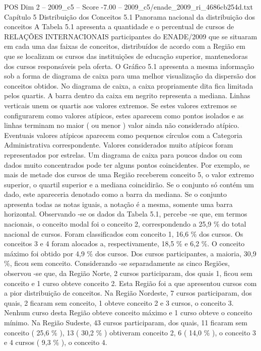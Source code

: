 \begin{textsample}{POS Dim 2 – 2009\_c5 – Score -7.00 – 2009\_c5/enade\_2009\_ri\_4686cb254d.txt}  \label{ex:f2_pos_418}
Capítulo 5 Distribuição dos Conceitos 5.1 Panorama nacional da distribuição dos conceitos A Tabela 5.1 apresenta a quantidade e o percentual de cursos de RELAÇÕES INTERNACIONAIS participantes do ENADE/2009 que se situaram em cada uma das faixas de conceitos, distribuídos de acordo com a Região em que se localizam os cursos das instituições de educação superior, mantenedoras dos cursos responsáveis pela oferta.
O Gráfico 5.1 apresenta a mesma informação sob a forma de diagrama de caixa para uma melhor visualização da dispersão dos conceitos obtidos.
No diagrama de caixa, a caixa propriamente dita fica limitada pelos quartis.
A barra dentro da caixa em negrito representa a mediana.
Linhas verticais unem os quartis aos valores extremos.
Se estes valores extremos se configurarem como valores atípicos, estes aparecem como pontos isolados e as linhas terminam no maior ( ou menor ) valor ainda não considerado atípico.
Eventuais valores atípicos aparecem como pequenos círculos com a Categoria Administrativa correspondente.
Valores considerados muito atípicos foram representados por estrelas.
Um diagrama de caixa para poucos dados ou com dados muito concentrados pode ter alguns pontos coincidentes.
Por exemplo, se mais de metade dos cursos de uma Região receberem conceito 5, o valor extremo superior, o quartil superior e a mediana coincidirão.
Se o conjunto só contém um dado, este apareceria denotado como a barra da mediana.
Se o conjunto apresenta todas as notas iguais, a notação é a mesma, somente uma barra horizontal.
Observando -se os dados da Tabela 5.1, percebe -se que, em termos nacionais, o conceito modal foi o conceito 2, correspondendo a 25,9 \% do total nacional de cursos.
Foram classificados com conceito 1, 16,6 \% dos cursos.
Os conceitos 3 e 4 foram alocados a, respectivamente, 18,5 \% e 6,2 \%.
O conceito máximo foi obtido por 4,9 \% dos cursos.
Dos cursos participantes, a maioria, 30,9 \%, ficou sem conceito.
Considerando -se separadamente as cinco Regiões, observou -se que, da Região Norte, 2 cursos participaram, dos quais 1, ficou sem conceito e 1 curso obteve conceito 2.
Esta Região foi a que apresentou cursos com a pior distribuição de conceitos.
Na Região Nordeste, 7 cursos participaram, dos quais, 2 ficaram sem conceito, 1 obteve conceito 2 e 3 cursos, o conceito 3.
Nenhum curso desta Região obteve conceito máximo e 1 curso obteve o conceito mínimo.
Na Região Sudeste, 43 cursos participaram, dos quais, 11 ficaram sem conceito ( 25,6 \% ), 13 ( 30,2 \% ) obtiveram conceito 2, 6 ( 14,0 \% ), o conceito 3 e 4 cursos ( 9,3 \% ), o conceito 4.

\end{textsample}
